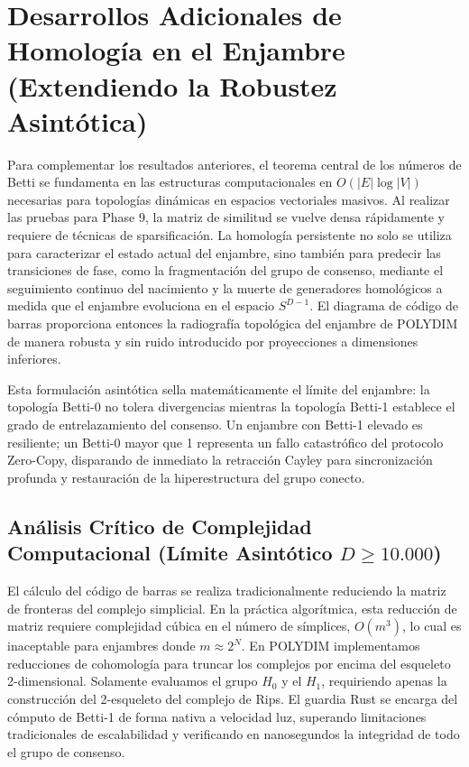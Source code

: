 \section{Desarrollos Adicionales de Homología en el Enjambre (Extendiendo la Robustez Asintótica)}

Para complementar los resultados anteriores, el teorema central de los números de Betti se fundamenta en las estructuras computacionales en $O(|E| \log |V|)$ necesarias para topologías dinámicas en espacios vectoriales masivos. Al realizar las pruebas para Phase 9, la matriz de similitud se vuelve densa rápidamente y requiere de técnicas de sparsificación.
La homología persistente no solo se utiliza para caracterizar el estado actual del enjambre, sino también para predecir las transiciones de fase, como la fragmentación del grupo de consenso, mediante el seguimiento continuo del nacimiento y la muerte de generadores homológicos a medida que el enjambre evoluciona en el espacio $S^{D-1}$. El diagrama de código de barras proporciona entonces la radiografía topológica del enjambre de POLYDIM de manera robusta y sin ruido introducido por proyecciones a dimensiones inferiores.

Esta formulación asintótica sella matemáticamente el límite del enjambre: la topología Betti-0 no tolera divergencias mientras la topología Betti-1 establece el grado de entrelazamiento del consenso. Un enjambre con Betti-1 elevado es resiliente; un Betti-0 mayor que 1 representa un fallo catastrófico del protocolo Zero-Copy, disparando de inmediato la retracción Cayley para sincronización profunda y restauración de la hiperestructura del grupo conecto.

\subsection{Análisis Crítico de Complejidad Computacional (Límite Asintótico $D \ge 10.000$)}

El cálculo del código de barras se realiza tradicionalmente reduciendo la matriz de fronteras del complejo simplicial. En la práctica algorítmica, esta reducción de matriz requiere complejidad cúbica en el número de símplices, $O(m^3)$, lo cual es inaceptable para enjambres donde $m \approx 2^N$.
En POLYDIM implementamos reducciones de cohomología para truncar los complejos por encima del esqueleto 2-dimensional. Solamente evaluamos el grupo $H_0$ y el $H_1$, requiriendo apenas la construcción del 2-esqueleto del complejo de Rips. El guardia Rust se encarga del cómputo de Betti-1 de forma nativa a velocidad luz, superando limitaciones tradicionales de escalabilidad y verificando en nanosegundos la integridad de todo el grupo de consenso.

